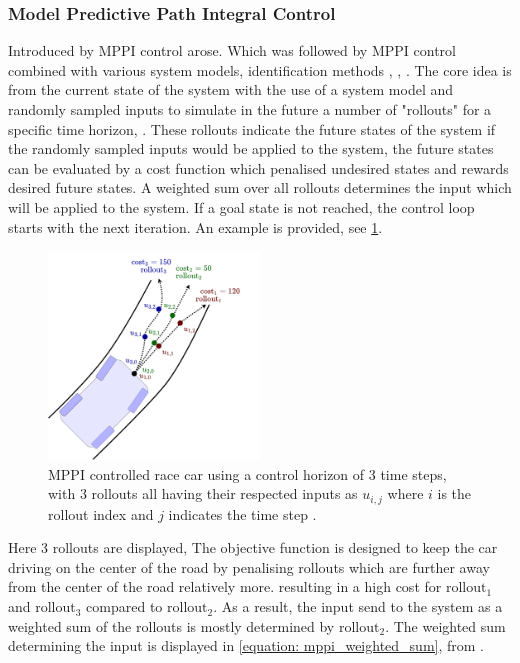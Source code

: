 \subsubsection*{Model Predictive Path Integral Control}
Introduced by \cite{williams_model_2015} \ac{MPPI} control arose. Which was followed by \ac{MPPI} control combined with various system models, identification methods \cite{abraham_model-based_2020}, \cite{cong_self-adapting_2020}, \cite{arruda_uncertainty_2017}. The core idea is from the current state of the system with the use of a system model and randomly sampled inputs to simulate in the future a number of "rollouts" for a specific time horizon, \cite{neuromorphic_tutorial_ltc21_2021}. These rollouts indicate the future states of the system if the randomly sampled inputs would be applied to the system, the future states can be evaluated by a cost function which penalised undesired states and rewards desired future states. A weighted sum over all rollouts determines the input which will be applied to the system. If a goal state is not reached, the control loop starts with the next iteration. An example is provided, see  \cref{figure: mppi_car_with_rollouts}. 

\begin{figure}[h]
    \centering
    \includegraphics[width=0.5\textwidth]{figures/MPPI_car_with_rollouts.png}
    \caption{\acs{MPPI} controlled race car using a control horizon of 3 time steps, with 3 rollouts all having their respected inputs as $u_{i,j}$ where $i$ is the rollout index and $j$ indicates the time step \cite{neuromorphic_tutorial_ltc21_2021}.}
    \label{figure: mppi_car_with_rollouts}
\end{figure}

Here 3 rollouts are displayed, The objective function is designed to keep the car driving on the center of the road by penalising rollouts which are further away from the center of the road relatively more. resulting in a high cost for $\text{rollout}_1$ and $\text{rollout}_3$ compared to $\text{rollout}_2$. As a result, the input send to the system as a weighted sum of the rollouts is mostly determined by $\text{rollout}_2$. The weighted sum determining the input is displayed in \cref{equation: mppi_weighted_sum}, from \cite{neuromorphic_tutorial_ltc21_2021}.

